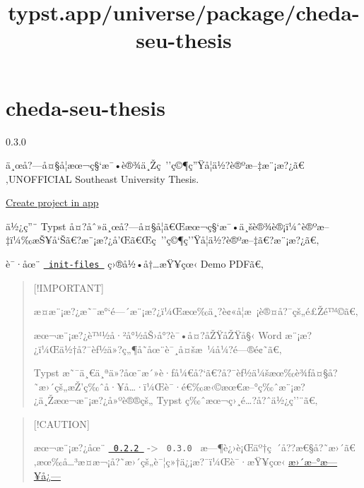 \title{typst.app/universe/package/cheda-seu-thesis}

\label{banner}
\label{template-thumbnail}

\section{cheda-seu-thesis}\label{cheda-seu-thesis}

{ 0.3.0 }

ä¸œå?---å¤§å­¦æœ¬ç§`æ¯•è®¾ä¸Žç~''ç©¶ç''Ÿå­¦ä½?è®ºæ--‡æ¨¡æ?¿ã€‚UNOFFICIAL
Southeast University Thesis.

\href{/app?template=cheda-seu-thesis&version=0.3.0}{Create project in
app}

\label{readme}
ä½¿ç''¨ Typst
å¤?åˆ»ä¸œå?---å¤§å­¦ã€Œæœ¬ç§`æ¯•ä¸šè®¾è®¡ï¼ˆè®ºæ--‡ï¼‰æŠ¥å`Šã€?æ¨¡æ?¿å'Œã€Œç~''ç©¶ç''Ÿå­¦ä½?è®ºæ--‡ã€?æ¨¡æ?¿ã€‚

è¯·åœ¨
\href{https://github.com/typst/packages/raw/main/packages/preview/cheda-seu-thesis/0.3.0/init-files/}{\texttt{\ init-files\ }}
ç›®å½•å†\ldots æŸ¥çœ‹ Demo PDFã€‚

\begin{quote}
{[}!IMPORTANT{]}

æ­¤æ¨¡æ?¿æ˜¯æ°`é---´æ¨¡æ?¿ï¼Œæœ‰ä¸?è¢«å­¦æ~¡è®¤å?¯çš„é£Žé™©ã€‚

æœ¬æ¨¡æ?¿è™½å·²å°½åŠ›å°?è¯•å¤?åŽŸåŽŸå§‹ Word
æ¨¡æ?¿ï¼Œä½†å?¯èƒ½ä»?ç„¶å­˜åœ¨è¯¸å¤šæ~¼å¼?é---®é¢˜ã€‚

Typst
æ˜¯ä¸€ä¸ªä»?åœ¨æ´»è·ƒå¼€å?{}`ã€?å?¯èƒ½ä¼šæœ‰è¾ƒå¤§å?˜æ›´çš„æŽ'ç‰ˆå·¥å\ldots·ï¼Œè¯·é€‰æ‹©æœ€æ--°ç‰ˆæ¨¡æ?¿ä¸Žæœ¬æ¨¡æ?¿å»ºè®®çš„
Typst ç‰ˆæœ¬ç›¸é\ldots?å?ˆä½¿ç''¨ã€‚
\end{quote}

\begin{quote}
{[}!CAUTION{]}

æœ¬æ¨¡æ?¿åœ¨
\href{https://github.com/csimide/SEU-Typst-Template/tree/c44b5172178c0c2380b322e50931750e2d761168}{\texttt{\ 0.2.2\ }}
-\textgreater{} \texttt{\ 0.3.0\ }
æ---¶è¿›è¡Œäº†ç~´å??æ€§å?˜æ›´ã€‚æœ‰å\ldots³æ­¤æ¬¡å?˜æ›´çš„è¯¦ç»†ä¿¡æ?¯ï¼Œè¯·æŸ¥çœ‹
\href{https://github.com/typst/packages/raw/main/packages/preview/cheda-seu-thesis/0.3.0/CHANGELOG.md}{æ›´æ--°æ---¥å¿---}
\end{quote}

